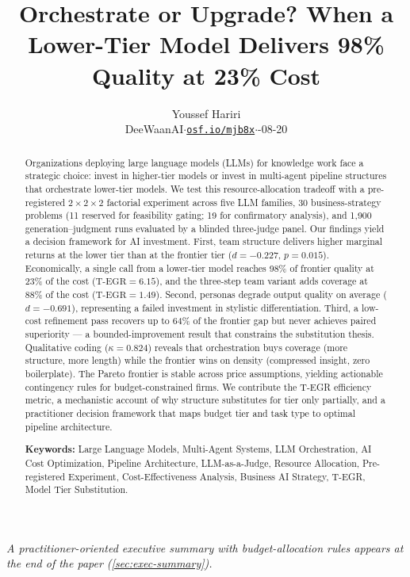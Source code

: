 \documentclass[12pt,a4paper]{article}
\title{\textbf{Orchestrate or Upgrade? When a Lower-Tier Model Delivers
98\% Quality at 23\% Cost}}
\author{Youssef Hariri\\
\small DeeWaanAI\quad $\cdot$\quad \href{https://osf.io/mjb8x}{\texttt{osf.io/mjb8x}}\quad $\cdot$\quad 2026-08-20}
\date{}
\newcommand{\TEGR}{\ensuremath{\text{T-EGR}}}
\begin{document}
\maketitle

\begin{abstract}
\noindent
Organizations deploying large language models (LLMs) for knowledge work face a
strategic choice: invest in higher-tier models or invest in multi-agent pipeline
structures that orchestrate lower-tier models. We test this resource-allocation
tradeoff with a pre-registered $2 \times 2 \times 2$ factorial experiment across
five LLM families, 30 business-strategy problems (11 reserved for feasibility
gating; 19 for confirmatory analysis), and 1{,}900
generation--judgment runs evaluated by a blinded three-judge panel. Our findings
yield a decision framework for AI investment. First, team structure delivers
higher marginal returns at the lower tier than at the frontier tier
($d = -0.227$, $p = 0.015$). Economically, a single call from a lower-tier
model reaches 98\% of frontier quality at 23\% of the cost ($\TEGR = 6.15$),
and the three-step team variant adds coverage at 88\% of the cost
($\TEGR = 1.49$). Second,
personas degrade output quality on average ($d = -0.691$), representing a
failed investment in stylistic differentiation. Third, a low-cost refinement
pass recovers up to 64\% of the frontier gap but never achieves paired
superiority --- a bounded-improvement result that constrains the substitution
thesis. Qualitative coding ($\kappa = 0.824$) reveals that orchestration buys
coverage (more structure, more length) while the frontier wins on density
(compressed insight, zero boilerplate). The Pareto frontier is stable across
price assumptions, yielding actionable contingency rules for budget-constrained
firms. We contribute the T-EGR efficiency metric, a mechanistic account of why
structure substitutes for tier only partially, and a practitioner decision
framework that maps budget tier and task type to optimal pipeline architecture.

\medskip
\noindent\textbf{Keywords:} Large Language Models, Multi-Agent Systems, LLM Orchestration,
AI Cost Optimization, Pipeline Architecture, LLM-as-a-Judge, Resource
Allocation, Pre-registered Experiment, Cost-Effectiveness Analysis, Business
AI Strategy, T-EGR, Model Tier Substitution.
\end{abstract}

\bigskip

\noindent\textit{A practitioner-oriented executive summary with budget-allocation
rules appears at the end of the paper (\cref{sec:exec-summary}).}
\end{document}
